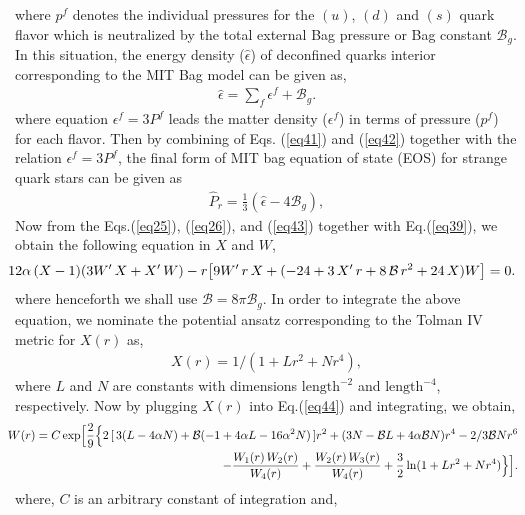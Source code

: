 \documentclass[]{aastex631}
\begin{document}
where ${p^f}$ denotes the individual pressures for the $(u)$, $(d)$ and $(s)$ quark flavor which is neutralized by the total external Bag pressure or Bag constant
$\mathcal{B}_g$. In this situation, the energy density  ($\hat{\epsilon}$) of deconfined quarks interior corresponding to the MIT Bag model can be given as, 
\begin{eqnarray}
\hat{\epsilon}=\sum_{f} \epsilon^{f}+\mathcal{B}_g.\label{eq42}
\end{eqnarray}
where equation $\epsilon^f=3P^f$ leads the matter density ($\epsilon^f$) in terms of pressure ($p^f$) for each flavor. Then by combining of Eqs. (\ref{eq41}) and (\ref{eq42}) together with the relation $\epsilon^f=3P^f$, the final form of MIT bag equation of state (EOS) for strange quark stars can be given as
\begin{eqnarray} \label{eq43}
\hat{P}_r=\frac{1}{3}(\hat{\epsilon}-4\mathcal{B}_g),  
\end{eqnarray} 
Now from the Eqs.(\ref{eq25}), (\ref{eq26}), and (\ref{eq43}) together with Eq.(\ref{eq39}), we obtain the  following equation in $X$ and $W$,
\begin{eqnarray}
&&\hspace{-0.6cm} 12 \alpha\, (X-1) (3 W^\prime\, X + X^\prime\, W) -
 r \big[ 9 W^\prime\, r\, X + (-24 + 3\,X^\prime\, r  + 8\, \mathcal{B}\, r^2 + 24\,X) W \big]=0. \label{eq44}
\end{eqnarray}
where henceforth we shall use $\mathcal{B}=8\pi\mathcal{B}_g$.  In order to integrate the above equation, we nominate the potential ansatz corresponding to the Tolman IV metric for  $X(r)$ as,
\begin{eqnarray}
X(r)=1/(1+Lr^2+Nr^4),  \label{eq45}
\end{eqnarray}
where $L$ and $N$ are constants with dimensions $\text{length}^{-2}$ and $\text{length}^{-4}$, respectively.
Now by plugging $X(r)$ into Eq.(\ref{eq44}) and integrating, we obtain,
\begin{eqnarray}
&&\hspace{-0.6cm} W(r)=C\,\text{exp}\Big[\frac{2}{9} \Big\{2\, [\, 3 (L - 4 \alpha N) + \mathcal{B} (-1 + 4 \alpha L - 16 \alpha^2 N)\,] r^2+ (3N-\mathcal{B} L+ 4 \alpha \mathcal{B} N) r^4 - 2/3 \mathcal{B} N r^6\nonumber\\
&&\hspace{0.4cm} -\frac{W_1(r)\,W_2(r)}{W_4(r)}  + \frac{W_2(r)\,W_3(r)}{W_4(r)} + \frac{3}{2} \ln(1 + L r^2 + N r^4)\Big\}\Big].  \label{eq46}
\end{eqnarray}
where, $C$ is an arbitrary constant of integration and,  
\end{document}
